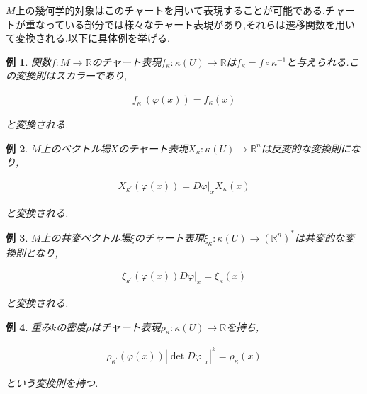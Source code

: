 \documentclass{jsarticle}
\newtheorem{exm}{例}
\begin{document}
$M$上の幾何学的対象はこのチャートを用いて表現することが可能である.チャートが重なっている部分では様々なチャート表現があり,それらは遷移関数を用いて変換される.以下に具体例を挙げる.\\

\begin{exm}
 
関数$f:M \to \mathbb{R}$のチャート表現$f_\kappa:\kappa(U) \to \mathbb{R}$は$f_\kappa = f \circ \kappa^{-1}$と与えられる.この変換則はスカラーであり,

\begin{align}
f_{\kappa^\prime}(\varphi(x)) =f_\kappa (x)
\end{align}

と変換される.

\end{exm}

\begin{exm} 

$M$上のベクトル場$X$のチャート表現$X_\kappa:\kappa(U) \to \mathbb{R}^n$は反変的な変換則になり,

\begin{align}
X_{\kappa^\prime}(\varphi(x)) = D\varphi\rvert_x X_\kappa(x)
\end{align}

と変換される.

\end{exm}

\begin{exm} 

$M$上の共変ベクトル場$\xi$のチャート表現$\xi_\kappa:\kappa(U)\to (\mathbb{R}^n)^*$は共変的な変換則となり,

\begin{align}
\xi_{\kappa^\prime}(\varphi(x))D\varphi\rvert_x = \xi_\kappa(x)
\end{align}

と変換される.

\end{exm}

\begin{exm}
  
重み$k$の密度$\rho$はチャート表現$\rho_\kappa:\kappa(U) \to \mathbb{R}$を持ち,

\begin{align}
\rho_{\kappa^\prime}(\varphi(x))|\det D\varphi\rvert_x|^k= \rho_\kappa(x)
\end{align}

という変換則を持つ.

\end{exm}
\end{document}
